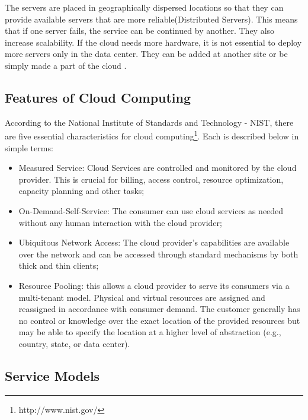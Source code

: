 The servers are placed in geographically dispersed locations so that they can provide available servers that are more reliable(Distributed Servers). This means that if one server fails, the service can be continued by another. They also increase scalability. If the cloud needs more hardware, it is not essential to deploy more servers only in the data center. They can be added at another site or be simply made a part of the cloud \cite{Velte2009}.

\subsection{Features of Cloud Computing}

According to the National Institute of Standards and Technology - NIST, there are five essential characteristics for cloud computing\footnote[8]{http://www.nist.gov/}. Each is described below in simple terms:

\begin{itemize}

\item Measured Service: Cloud Services are controlled and monitored by the cloud provider. This is crucial for billing, access control, resource optimization, capacity planning and other tasks;

\item On-Demand-Self-Service: The consumer can use cloud services as needed without any human interaction with the cloud provider; 

\item Ubiquitous Network Access: The cloud provider's capabilities are available over the network and can be accessed through standard mechanisms by both thick and thin clients; 

\item Resource Pooling: this allows a cloud provider to serve its consumers via a multi-tenant model. Physical and virtual resources are assigned and reassigned in accordance with consumer demand. The customer generally has no control or knowledge over the exact location of the provided resources but may be able to specify the location at a higher level of abstraction (e.g., country, state, or data center).

\end{itemize}

\subsection{Service Models}

